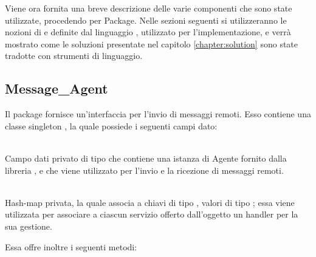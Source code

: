 	Viene ora fornita una breve descrizione delle varie componenti che sono state utilizzate, procedendo per Package. Nelle sezioni seguenti si utilizzeranno le nozioni di  e  definite dal linguaggio , utilizzato per l'implementazione, e verrà mostrato come le soluzioni presentate nel capitolo \ref{chapter:solution} sono state tradotte con strumenti di linguaggio.

	\subsection{Message\_Agent}
	
	Il package  fornisce un'interfaccia per l'invio di messaggi remoti. Esso contiene una classe singleton , la quale possiede i seguenti campi dato:
	\begin{description}
		\item {} \\
		Campo dati privato di tipo  che contiene una istanza di Agente fornito dalla libreria , e che viene utilizzato per l'invio e la ricezione di messaggi remoti.
		\item {} \\
		Hash-map privata, la quale associa a chiavi di tipo , valori di tipo ; essa viene utilizzata per associare a ciascun servizio offerto dall'oggetto  un handler per la sua gestione.
	\end{description}
	
	Essa offre inoltre i seguenti metodi:
	
